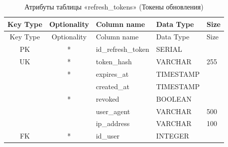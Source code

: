 \begin{xltabular}{\textwidth}{|c|c|l|l|X|}
	\caption{Атрибуты таблицы «refresh\_tokens» (Токены обновления)\label{tab:tokens}}\\ \hline
	\centrow Key Type & \centrow Optionality & \centrow Column name & \centrow Data Type & \centrow Size \\ \hline
	\endfirsthead
	
	\centrow Key Type & \centrow Optionality & \centrow Column name & \centrow Data Type & \centrow Size \\ \hline
	\endhead
	
	PK & * & id\_refresh\_token & SERIAL & \\ \hline
	UK & * & token\_hash & VARCHAR & 255 \\ \hline
	& * & expires\_at & TIMESTAMP & \\ \hline
	&  & created\_at & TIMESTAMP & \\ \hline
	& * & revoked & BOOLEAN & \\ \hline
	&  & user\_agent & VARCHAR & 500 \\ \hline
	&  & ip\_address & VARCHAR & 100 \\ \hline
	FK & * & id\_user & INTEGER & \\ \hline
\end{xltabular}